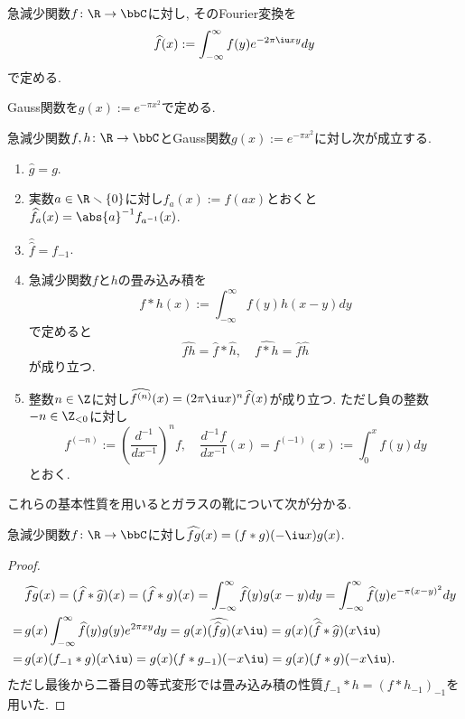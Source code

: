 \documentclass[11pt,b5paper,oneside,lualatex]{ltjsarticle} %
\renewcommand{\setminus}{\smallsetminus}
\numberwithin{equation}{section} %
\begin{document}
\begin{dfn}
	急減少関数$ f \colon \R \to \bbC $に対し, そのFourier変換を
	\[
	\widehat{f}(x) := \int_{-\infty}^{\infty} f(y) e^{-2\pi\iu xy} dy
	\]
	で定める. 
\end{dfn}

\begin{nota}
	Gauss関数を$ g(x) := e^{-\pi x^2} $で定める. 
\end{nota}

\begin{lem} \label{lem:Fourier}
	急減少関数$ f, h \colon \R \to \bbC $とGauss関数$ g(x) := e^{-\pi x^2} $に対し次が成立する. 
	\begin{enumerate}
		\item $ \widehat{g} = g $.
		\item 実数$ a \in \R \setminus \{ 0 \} $に対し$ f_a(x) := f(ax) $とおくと
		$ \widehat{f_a}(x) = \abs{a}^{-1} f_{a^{-1}} (x) $.
		\item $ \widehat{\widehat{f}} = f_{-1} $.
		\item 急減少関数$ f $と$ h $の畳み込み積を
		\[
		f \ast h (x) := \int_{-\infty}^{\infty} f(y) h(x-y) dy
		\]
		で定めると
		\[
		\widehat{fh} = \widehat{f} \ast \widehat{h}, \quad
		\widehat{f \ast h} = \widehat{f} \widehat{h}
		\]
		 が成り立つ. 
		 \item \label{item:lem:Fourier_diff}
		 整数$ n \in \Z $に対し$ \widehat{f^{(n)}} (x) = (2 \pi \iu x)^n \widehat{f}(x) $が成り立つ. 
		 ただし負の整数$ -n \in \Z_{<0} $に対し
		 \[
		 f^{(-n)} := \left( \frac{d^{-1}}{dx^{-1}} \right)^n f, \quad
		 \frac{d^{-1} f}{dx^{-1}} (x) = f^{(-1)} (x) := \int_{0}^{x} f(y) dy
		 \]
		 とおく.
	\end{enumerate}
\end{lem}

これらの基本性質を用いるとガラスの靴について次が分かる. 

\begin{lem}
	急減少関数$ f \colon \R \to \bbC $に対し$ \widehat{fg}(x) = (f \ast g)(-\iu x) g(x)  $.
\end{lem}

\begin{proof}
	\begin{align}
		&\widehat{fg}(x) 
		=
		(\widehat{f} \ast \widehat{g}) (x)
		=
		(\widehat{f} \ast g) (x)
		=
		\int_{-\infty}^{\infty} \widehat{f} (y) g(x-y) dy
		=
		\int_{-\infty}^{\infty} \widehat{f} (y) e^{-\pi (x-y)^2} dy
		\\
		= \,
		&g(x) \int_{-\infty}^{\infty} \widehat{f} (y) g(y) e^{2\pi xy} dy
		=
		g(x) \widehat{(\widehat{f} g)} (x \iu)
		=
		g(x) ( \widehat{\widehat{f}} \ast \widehat{g}) (x \iu)
		\\
		= \,
		&g(x) ( f_{-1} \ast g) (x \iu)
		=
		g(x) ( f \ast g_{-1}) (-x \iu)
		=
		g(x) ( f \ast g) (-x \iu).
	\end{align}
	ただし最後から二番目の等式変形では畳み込み積の性質$ f_{-1} \ast h =  (f \ast h_{-1})_{-1} $を用いた. 
\end{proof}
\end{document}
